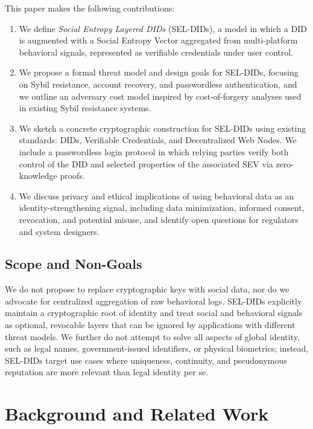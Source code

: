 \documentclass[11pt]{article}
\begin{document}
This paper makes the following contributions:

\begin{enumerate}[label=(C\arabic*)]
  \item We define \emph{Social Entropy Layered DIDs} (SEL-DIDs), a model in which a DID is augmented with a Social Entropy Vector aggregated from multi-platform behavioral signals, represented as verifiable credentials under user control.
  \item We propose a formal threat model and design goals for SEL-DIDs, focusing on Sybil resistance, account recovery, and passwordless authentication, and we outline an adversary cost model inspired by cost-of-forgery analyses used in existing Sybil resistance systems.\cite{gitcoin_cost_of_forgery}
  \item We sketch a concrete cryptographic construction for SEL-DIDs using existing standards: DIDs, Verifiable Credentials, and Decentralized Web Nodes. We include a passwordless login protocol in which relying parties verify both control of the DID and selected properties of the associated SEV via zero-knowledge proofs.
  \item We discuss privacy and ethical implications of using behavioral data as an identity-strengthening signal, including data minimization, informed consent, revocation, and potential misuse, and identify open questions for regulators and system designers.
\end{enumerate}

\subsection{Scope and Non-Goals}

We do not propose to replace cryptographic keys with social data, nor do we advocate for centralized aggregation of raw behavioral logs. SEL-DIDs explicitly maintain a cryptographic root of identity and treat social and behavioral signals as optional, revocable layers that can be ignored by applications with different threat models. We further do not attempt to solve all aspects of global identity, such as legal names, government-issued identifiers, or physical biometrics; instead, SEL-DIDs target use cases where uniqueness, continuity, and pseudonymous reputation are more relevant than legal identity per se.


\section{Background and Related Work}
\end{document}
